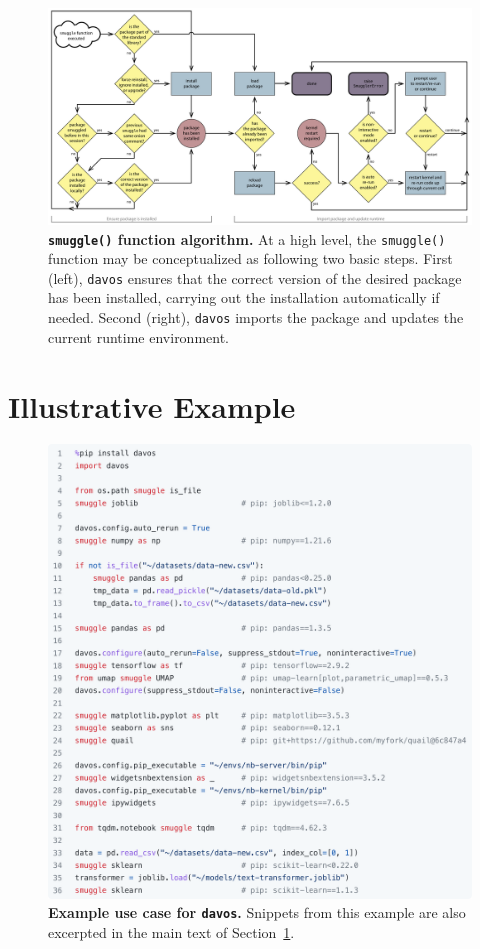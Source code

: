 \documentclass[preprint,12pt,a4paper]{elsarticle}
\begin{document}
\begin{figure}[tp]
\centering
\includegraphics[width=\textwidth]{figs/flow_chart}
\caption{\small \textbf{\texttt{smuggle()} function algorithm.}  At a
  high level, the \texttt{smuggle()} function may be conceptualized as
following two basic steps.  First (left), \texttt{davos} ensures that the
correct version of the desired package has been installed, carrying
out the installation automatically if needed.  Second (right),
\texttt{davos} imports the package and updates the current runtime environment.}
\label{fig:flow-chart}
\end{figure}


\section{Illustrative Example}\label{sec:illustrative-example}

\begin{figure}[tp]
\centering
\includegraphics[width=\textwidth]{figs/illustrative_example}
\caption{\small \textbf{Example use case for \texttt{davos}.}
  Snippets from this example are also excerpted in the main text of
  Section~\ref{sec:illustrative-example}.}
\label{fig:illustrative-example}
\end{figure}
\end{document}
